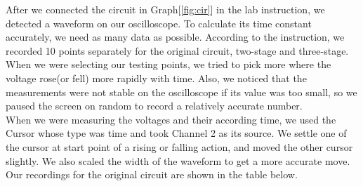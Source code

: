 \phantom{ } After we connected the circuit in Graph[\ref{fig:cir}] in the lab instruction, we detected a waveform on our oscilloscope. To calculate its time constant accurately, we need as many data as possible. According to the instruction, we recorded 10 points separately for the original circuit, two-stage and three-stage. When we were selecting our testing points, we tried to pick more where the voltage rose(or fell) more rapidly with time. Also, we noticed that the measurements were not stable on the oscilloscope if its value was too small, so we paused the screen on random to record a relatively accurate number.\\
\phantom{ } When we were measuring the voltages and their according time, we used the Cursor whose type was time and took Channel 2 as its source. We settle one of the cursor at start point of a rising or falling action, and moved the other cursor slightly. We also scaled the width of the waveform to get a more accurate move.\\
\phantom{ } Our recordings for the original circuit are shown in the table below.


